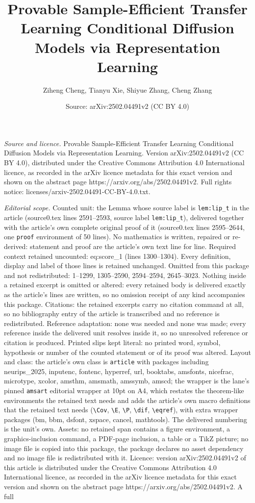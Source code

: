 \documentclass[10pt,a4paper]{amsart}
\title[Provable Sample-Efficient Transfer Learning Conditional Diff]{Provable Sample-Efficient Transfer Learning Conditional Diffusion Models via Representation Learning}
\author{Ziheng Cheng, Tianyu Xie, Shiyue Zhang, Cheng Zhang}
\date{Source: arXiv:2502.04491v2 (CC BY 4.0)}
\begin{document}
\maketitle

\noindent\emph{Source and licence.} Provable Sample-Efficient Transfer Learning Conditional Diffusion Models via Representation Learning. Version arXiv:2502.04491v2 (CC BY 4.0), distributed under the Creative Commons Attribution 4.0 International licence, as recorded in the arXiv licence metadata for this exact version and shown on the abstract page https://arxiv.org/abs/2502.04491v2. Full rights notice: licenses/arxiv-2502.04491-CC-BY-4.0.txt.\par\smallskip

\noindent\textit{Editorial scope.} Counted unit: the Lemma whose source label is \texttt{lem:lip\_t} in the article (source0.tex lines 2591--2593, source label \texttt{lem:lip\_t}), delivered together with the article's own complete original proof of it (source0.tex lines 2595--2644, one \texttt{proof} environment of 50 lines). No mathematics is written, repaired or re-derived: statement and proof are the article's own text line for line. Required context retained uncounted: eq:score\_1 (lines 1300--1304). Every definition, display and label of those lines is retained unchanged. Omitted from this package and not redistributed: 1--1299, 1305--2590, 2594--2594, 2645--3023. Nothing inside a retained excerpt is omitted or altered: every retained body is delivered exactly as the article's lines are written, so no omission receipt of any kind accompanies this package. Citations: the retained excerpts carry no citation command at all, so no bibliography entry of the article is transcribed and no reference is redistributed. Reference adaptation: none was needed and none was made; every reference inside the delivered unit resolves inside it, so no unresolved reference or citation is produced. Printed slips kept literal: no printed word, symbol, hypothesis or number of the counted statement or of its proof was altered. Layout and class: the article's own class is \texttt{article} with packages including neurips\_2025, inputenc, fontenc, hyperref, url, booktabs, amsfonts, nicefrac, microtype, xcolor, amsthm, amsmath, amssymb, amscd; the wrapper is the lane's pinned \texttt{amsart} editorial wrapper at 10pt on A4, which restates the theorem-like environments the retained text needs and adds the article's own macro definitions that the retained text needs (\texttt{\textbackslash Cov}, \texttt{\textbackslash E}, \texttt{\textbackslash P}, \texttt{\textbackslash dif}, \texttt{\textbackslash eqref}), with extra wrapper packages (bm, bbm, dsfont, xspace, cancel, mathtools). The delivered numbering is the unit's own. Assets: no retained span contains a figure environment, a graphics-inclusion command, a PDF-page inclusion, a table or a TikZ picture; no image file is copied into this package, the package declares no asset dependency and no image file is redistributed with it. Licence: version arXiv:2502.04491v2 of this article is distributed under the Creative Commons Attribution 4.0 International licence, as recorded in the arXiv licence metadata for this exact version and shown on the abstract page https://arxiv.org/abs/2502.04491v2. A full 
\end{document}
